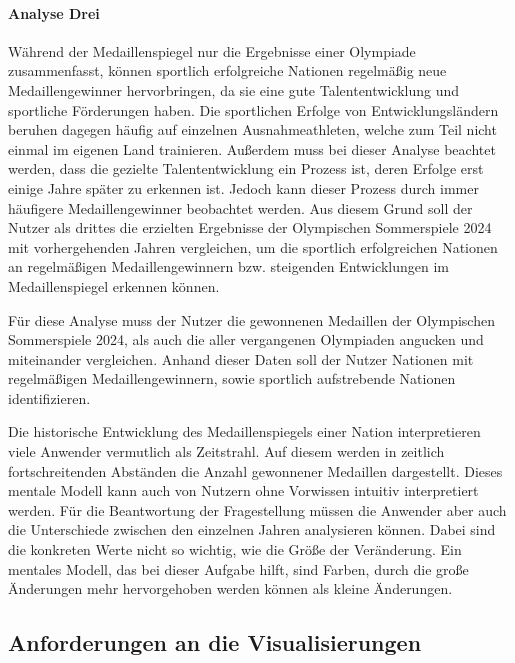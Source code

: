\paragraph{Analyse Drei}
Während der Medaillenspiegel nur die Ergebnisse einer Olympiade zusammenfasst, können sportlich erfolgreiche Nationen regelmäßig neue Medaillengewinner hervorbringen, da sie eine gute Talententwicklung und sportliche Förderungen haben. Die sportlichen Erfolge von Entwicklungsländern beruhen dagegen häufig auf einzelnen Ausnahmeathleten, welche zum Teil nicht einmal im eigenen Land trainieren. Außerdem muss bei dieser Analyse beachtet werden, dass die gezielte Talententwicklung ein Prozess ist, deren Erfolge erst einige Jahre später zu erkennen ist. Jedoch kann dieser Prozess durch immer häufigere Medaillengewinner beobachtet werden. Aus diesem Grund soll der Nutzer als drittes die erzielten Ergebnisse der Olympischen Sommerspiele 2024 mit vorhergehenden Jahren vergleichen, um die sportlich erfolgreichen Nationen an regelmäßigen Medaillengewinnern bzw. steigenden Entwicklungen im Medaillenspiegel erkennen können.

Für diese Analyse muss der Nutzer die gewonnenen Medaillen der Olympischen Sommerspiele 2024, als auch die aller vergangenen Olympiaden angucken und miteinander vergleichen. Anhand dieser Daten soll der Nutzer Nationen mit regelmäßigen Medaillengewinnern, sowie sportlich aufstrebende Nationen identifizieren.

Die historische Entwicklung des Medaillenspiegels einer Nation interpretieren viele Anwender vermutlich als Zeitstrahl. Auf diesem werden in zeitlich fortschreitenden Abständen die Anzahl gewonnener Medaillen dargestellt. Dieses mentale Modell kann auch von Nutzern ohne Vorwissen intuitiv interpretiert werden. Für die Beantwortung der Fragestellung müssen die Anwender aber auch die Unterschiede zwischen den einzelnen Jahren analysieren können. Dabei sind die konkreten Werte nicht so wichtig, wie die Größe der Veränderung. Ein mentales Modell, das bei dieser Aufgabe hilft, sind Farben, durch die große Änderungen mehr hervorgehoben werden können als kleine Änderungen.

\subsection{Anforderungen an die Visualisierungen}

